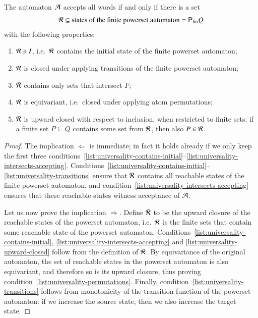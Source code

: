 \begin{lemma}\label{lem:universality-invariant}
    The automaton ${\mathcal A}$ accepts all words if and only if there is a set 
    \begin{align*}
    {\mathcal R} \subseteq \text{states of the finite powerset automaton} = {\mathsf P}_{\text{fin}} Q
    \end{align*}
    with the following properties:
    \begin{enumerate}
        \item \label{list:universality-contains-initial} ${\mathcal R} \ni I$, i.e.~${\mathcal R}$ contains the initial state of the finite powerset automaton;
        \item \label{list:universality-transitions} ${\mathcal R}$ is closed under applying transitions of the finite powerset automaton;
        \item \label{list:universality-intersects-accepting} ${\mathcal R}$ contains only sets that intersect $F$;
        \item \label{list:universality-permutations} ${\mathcal R}$ is equivariant, i.e.~closed under applying atom permutations;
        \item \label{list:universality-upward-closed} ${\mathcal R}$ is upward closed with respect to inclusion, when restricted to finite sets: if a finite set $P \subseteq Q$ contains some set from ${\mathcal R}$, then also $P \in {\mathcal R}$.
    \end{enumerate}
\end{lemma}
\begin{proof}
    The  implication $\Leftarrow$ is immediate; in fact it holds already if we only keep the first three conditions~\ref{list:universality-contains-initial}--\ref{list:universality-intersects-accepting}. Conditions~\ref{list:universality-contains-initial}--\ref{list:universality-transitions} ensure that ${\mathcal R}$ contains all reachable states of the finite powerset automaton, and condition~\ref{list:universality-intersects-accepting} ensures that these reachable states witness acceptance of ${\mathcal A}$. 

    Let us now prove the  implication $\Rightarrow$. Define ${\mathcal R}$ to be the upward closure of the reachable states of the powerset automaton, i.e.~${\mathcal R}$ is the  finite sets that contain some reachable state of the powerset automaton. Conditions~\ref{list:universality-contains-initial}, \ref{list:universality-intersects-accepting} and \ref{list:universality-upward-closed} follow from the definition of ${\mathcal R}$. By equivariance of the original automaton, the set of reachable states in the powerset automaton is also equivariant, and therefore so is its upward closure, thus proving condition~\ref{list:universality-permutations}. Finally, condition~\ref{list:universality-transitions} follows from monotonicity of the transition function of the powerset automaton: if we increase the source state, then we also increase the target state. 
\end{proof}

